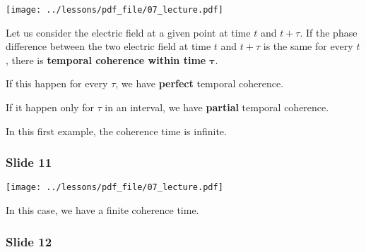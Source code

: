 \documentclass[../main/main.tex]{subfiles}
\begin{document}
\begin{minipage}[]{0.5\linewidth}
\centering
\texttt{[image: ../lessons/pdf\_file/07\_lecture.pdf]}
\end{minipage}
\hspace{0.3cm}\vspace{0.3cm}
\begin{minipage}[c]{0.47\linewidth}

Let us consider the electric field at a given point at time \( t \) and \( t + \tau  \). If the phase difference between the two electric field at time \( t \) and \( t + \tau  \) is the same for every \( t \), there is \textbf{temporal coherence within time} \( \pmb{\tau } \).

If this happen for every \( \tau  \), we have \textbf{perfect} temporal coherence.

If it happen only for \( \tau  \) in an interval, we have \textbf{partial} temporal coherence.

In this first example, the coherence time is infinite.


\end{minipage}

\subsubsection*{Slide 11}

\begin{minipage}[]{0.5\linewidth}
\centering
\texttt{[image: ../lessons/pdf\_file/07\_lecture.pdf]}
\end{minipage}
\hspace{0.3cm}\vspace{0.3cm}
\begin{minipage}[c]{0.47\linewidth}

In this case, we have a finite coherence time.

\end{minipage}

\subsubsection*{Slide 12}
\end{document}
